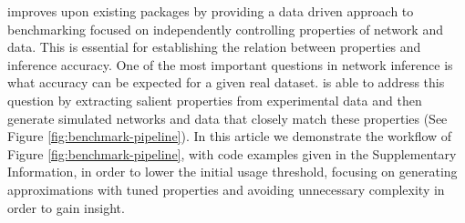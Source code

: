 \gs improves upon existing packages by providing a data driven approach to benchmarking focused on independently controlling properties of network and data. This is essential for establishing the relation between properties and inference accuracy. One of the most important questions in network inference is what accuracy can be expected for a given real dataset. \gs is able to address this question by extracting salient properties from experimental data and then generate simulated networks and data that closely match these properties (See Figure \ref{fig:benchmark-pipeline}).
In this article we demonstrate the workflow of \gs Figure \ref{fig:benchmark-pipeline}, with code examples given in the Supplementary Information, in order to lower the initial usage threshold, focusing on generating approximations with tuned properties and avoiding unnecessary complexity in order to gain insight.

